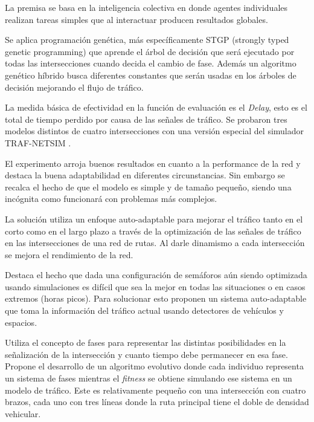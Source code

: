 \begin{itemize}
\begin{item}
La premisa se basa en la inteligencia colectiva en donde agentes individuales realizan tareas simples que al interactuar producen resultados globales.

Se aplica programación genética, más específicamente STGP (strongly typed genetic programming) \citep{Montana1995} que aprende el árbol de decisión que será ejecutado por todas las intersecciones cuando decida el cambio de fase. Además un algoritmo genético híbrido busca diferentes constantes que serán usadas en los árboles de decisión mejorando el flujo de tráfico.

La medida básica de efectividad en la función de evaluación es el \emph{Delay}, esto es el total de tiempo perdido por causa de las señales de tráfico. Se probaron tres modelos distintos de cuatro intersecciones con una versión especial del simulador TRAF-NETSIM \citep{TRAF-NETSIM}.

El experimento arroja buenos resultados en cuanto a la performance de la red y destaca la buena adaptabilidad en diferentes circunstancias. Sin embargo se recalca el hecho de que el modelo es simple y de tamaño pequeño, siendo una incógnita como funcionará con problemas más complejos.

\end{item}	


\begin{item}

La solución utiliza un enfoque auto-adaptable para mejorar el tráfico tanto en el corto como en el largo plazo a través de la optimización de las señales de tráfico en las intersecciones de una red de rutas. Al darle dinamismo a cada intersección se mejora el rendimiento de la red.

Destaca el hecho que dada una configuración de semáforos aún siendo optimizada usando simulaciones es difícil que sea la mejor en todas las situaciones o en casos extremos (horas picos). Para solucionar esto proponen un sistema auto-adaptable que toma la información del tráfico actual usando detectores de vehículos y espacios.

Utiliza el concepto de fases para representar las distintas posibilidades en la señalización de la intersección y cuanto tiempo debe permanecer en esa fase. 
Propone el desarrollo de un algoritmo evolutivo donde cada individuo representa un sistema de fases mientras el \emph{fitness} se obtiene simulando ese sistema en un modelo de tráfico. Este es relativamente pequeño con una intersección con cuatro brazos, cada uno con tres líneas donde la ruta principal tiene el doble de densidad vehicular. 


\end{item}
\end{itemize}
